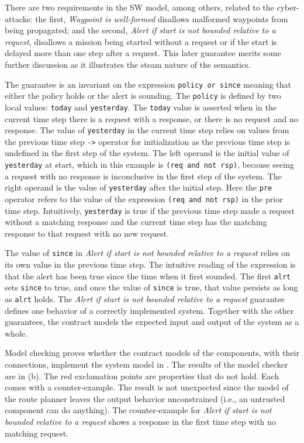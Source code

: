 There are two requirements in the SW model, among others, related to the cyber-attacks: the first, \emph{Waypoint is well-formed} disallows malformed waypoints from being propagated; and the second, \emph{Alert if start is not bounded relative to a request}, disallows a mission being started without a request or if the start is delayed more than one step after a request. This later guarantee merits some further discussion as it illustrates the steam nature of the semantics.

The guarantee is an invariant on the expression \texttt{policy or since} meaning that either the policy holds or the alert is sounding. The \texttt{policy} is defined by two local values: \texttt{today} and \texttt{yesterday}. The \texttt{today} value is asserted when in the current time step there is a request with a response, or there is no request and no response.  The value of \texttt{yesterday} in the current time step relies on values from the previous time step \texttt{->} operator for initialization as the previous time step is undefined in the first step of the system. The left operand is the initial value of \texttt{yesterday} at start, which in this example is \texttt{(req and not rsp)}, because seeing a request with no response is inconclusive in the first step of the system. The right operand is the value of \texttt{yesterday} after the initial step. Here the \texttt{pre} operator refers to the value of the expression \texttt{(req and not rsp)} in the prior time step. Intuitively, \texttt{yesterday} is true if the previous time step made a request without a matching response and the current time step has the matching response to that request with no new request.

The value of \texttt{since} in \emph{Alert if start is not bounded relative to a request} relies on its own value in the previous time step. The intuitive reading of the expression is that the alert has been true since the time when it first sounded. The first \texttt{alrt} sets \texttt{since} to true, and once the value of \texttt{since} is true, that value persists as long as \texttt{alrt} holds. The \emph{Alert if start is not bounded relative to a request} guarantee defines one behavior of a correctly implemented system. Together with the other guarantees, the contract models the expected input and output of the system as a whole.

Model checking proves whether the contract models of the components, with their connections, implement the system model in . The results of the model checker are in (b). The red exclamation points are properties that do not hold. Each comes with a counter-example. The result is not unexpected since the model of the route planner leaves the output behavior unconstrained (i.e., an untrusted component can do anything). The counter-example for \emph{Alert if start is not bounded relative to a request} shows a response in the first time step with no matching request.

